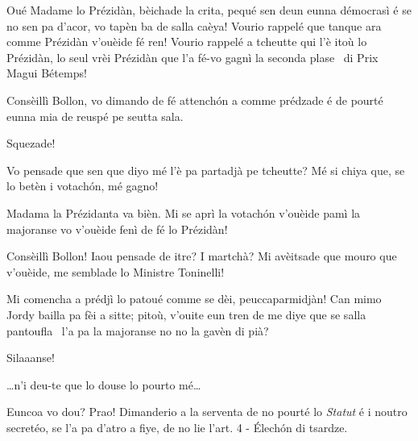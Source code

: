 \begin{drama}
\Jordyspeaks Oué Madame lo Prézidàn, bèichade la crita, pequé sen deun eunna démocrasì é se no sen pa d'acor, vo tapèn ba de salla caèya! Vourio rappelé que tanque ara comme Prézidàn v'ouèide fé ren! Vourio rappelé a tcheutte qui l'è itoù lo Prézidàn, lo seul vrèi Prézidàn que l'a fé-vo gagnì la seconda plase \second\ di Prix Magui Bétemps!


\Presidanspeaks Consèillì Bollon, vo dimando de fé attench\'on a comme prédzade é de pourté eunna mia de reuspé pe seutta sala.

\Jordyspeaks Squezade!

\Presidanspeaks{} Vo pensade que sen que diyo mé l'è pa partadjà pe tcheutte? Mé si chiya que, se lo betèn i votach\'on, mé gagno!


\Jordyspeaks  Madama la Prézidanta va bièn. Mi se aprì la votach\'on v'ouèide pamì la majoranse vo v'ouèide fenì de fé lo Prézidàn!

\Dallasspeaks  Consèillì Bollon! Iaou pensade de itre? I martchà? Mi avèitsade que mouro que v'ouèide, me semblade lo Ministre Toninelli!

\Cimaspeaks {} Mi comencha a prédjì lo patoué comme se dèi, peuccaparmidjàn! Can mimo Jordy bailla pa fèi a sitte; pitoù, v'ouite eun tren de me diye que se salla pantoufla \pantoufla\ l'a pa la majoranse no no la gavèn di pià?


\Presidanspeaks{}  Silaaanse!


\Richardspeaks \ldots  n'i deu-te que lo douse lo pourto mé\ldots

\Presidanspeaks Euncoa vo dou? Prao! Dimanderio a la serventa de no pourté lo \textit{Statut} é i noutro secretéo, se l'a pa d'atro a fiye, de no lie l'art. 4 - \'Elech\'on di tsardze.



\end{drama}
